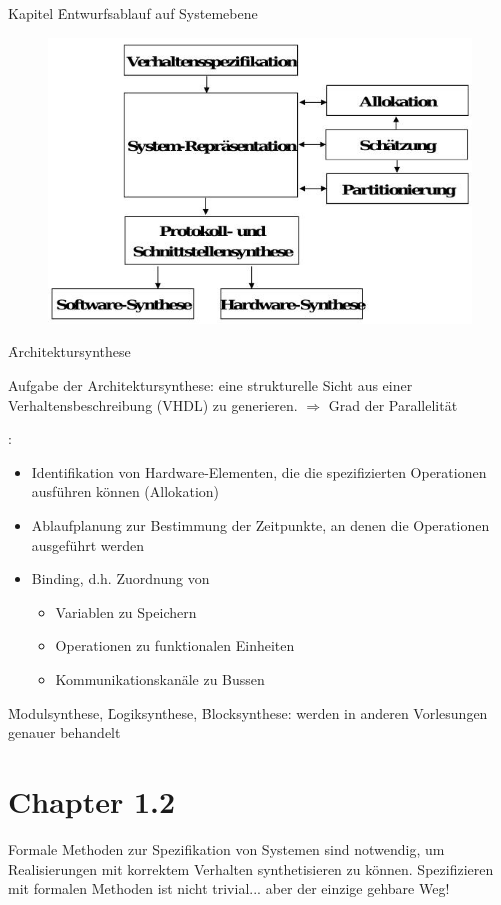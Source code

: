 \begin{chapter}{Kapitel}
\f{Entwurfsablauf auf Systemebene}
\begin{figure}[!ht]
 \centering
 \includegraphics[scale=0.6]{pics/entwurfAufSystemebene}
\end{figure}

\f{Architektursynthese}

\noindent Aufgabe der Architektursynthese: eine strukturelle Sicht aus einer Verhaltensbeschreibung (\zb VHDL) zu generieren. $\Rightarrow$ Grad der Parallelität
\vspace*{5pt}

:
\begin{itemize}
 \item Identifikation von Hardware-Elementen, die die spezifizierten Operationen ausführen können (Allokation)
 \item Ablaufplanung zur Bestimmung der Zeitpunkte, an denen die Operationen ausgeführt werden
 \item Binding, d.h. Zuordnung von 
 \begin{itemize}
  \item Variablen zu Speichern 
  \item Operationen zu funktionalen Einheiten
  \item Kommunikationskanäle zu Bussen
 \end{itemize}
\end{itemize}
\f{Modulsynthese}, \f{Logiksynthese}, \f{Blocksynthese}: werden in anderen Vorlesungen genauer behandelt

\section*{Chapter 1.2}
Formale Methoden zur Spezifikation von Systemen sind notwendig, um Realisierungen mit korrektem Verhalten synthetisieren zu können. Spezifizieren mit formalen 
Methoden ist nicht trivial... aber der einzige gehbare Weg!
\vspace*{3pt}


\end{chapter}
